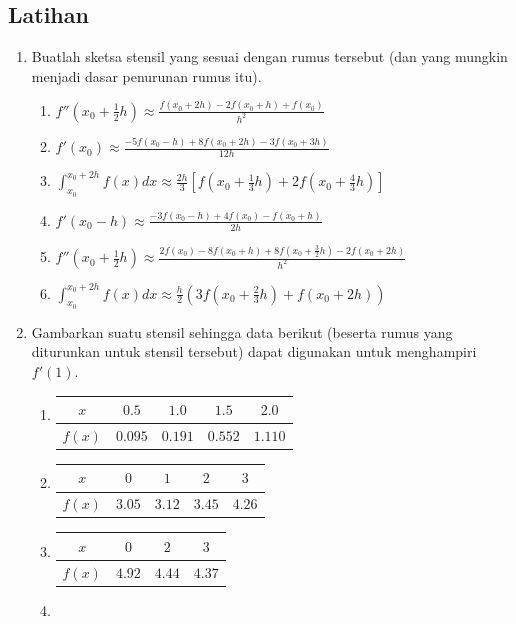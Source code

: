 \subsection{Latihan}
\begin{enumerate}
\item Buatlah sketsa stensil yang sesuai dengan rumus tersebut (dan yang
mungkin menjadi dasar penurunan rumus itu).
\begin{enumerate}
\item $f''\left(x_{0}+\frac{1}{2}h\right)\approx\frac{f(x_{0}+2h)-2f(x_{0}+h)+f(x_{0})}{h^{2}}$
\item $f'(x_{0})\approx\frac{-5f(x_{0}-h)+8f(x_{0}+2h)-3f(x_{0}+3h)}{12h}$
\item \label{exc:rudiments-29}$\int_{x_{0}}^{x_{0}+2h}f(x)dx\approx\frac{2h}{3}\left[f\left(x_{0}+\frac{1}{3}h\right)+2f\left(x_{0}+\frac{4}{3}h\right)\right]$ \hasasolution 
\item $f'\left(x_{0}-h\right)\approx\frac{-3f(x_{0}-h)+4f(x_{0})-f(x_{0}+h)}{2h}$
\item \label{exc:rudiments-30}$f''\left(x_{0}+\frac{1}{2}h\right)\approx\frac{2f(x_{0})-8f(x_{0}+h)+8f(x_{0}+\frac{3}{2}h)-2f(x_{0}+2h)}{h^{2}}$ \hasasolution 
\item $\int_{x_{0}}^{x_{0}+2h}f(x)dx\approx\frac{h}{2}\left(3f\left(x_{0}+\frac{2}{3}h\right)+f(x_{0}+2h)\right)$
\end{enumerate}
\item Gambarkan suatu stensil sehingga data berikut (beserta rumus yang
diturunkan untuk stensil tersebut) dapat digunakan untuk menghampiri
$f'(1)$.
\begin{enumerate}
\item %
\begin{tabular}{c|cccc}
$x$ & $0.5$ & $1.0$ & $1.5$ & $2.0$\tabularnewline
\hline 
$f(x)$ & $0.095$ & $0.191$ & $0.552$ & $1.110$\tabularnewline
\end{tabular}
\item \label{exc:rudiments-31}%
\begin{tabular}{c|cccc}
$x$ & $0$ & $1$ & $2$ & $3$\tabularnewline
\hline 
$f(x)$ & $3.05$ & $3.12$ & $3.45$ & $4.26$\tabularnewline
\end{tabular} \hasasolution 
\item %
\begin{tabular}{c|ccc}
$x$ & $0$ & $2$ & $3$\tabularnewline
\hline 
$f(x)$ & $4.92$ & $4.44$ & $4.37$\tabularnewline
\end{tabular}
\item \label{exc:rudiments-32}%

\end{enumerate}
\end{enumerate}
